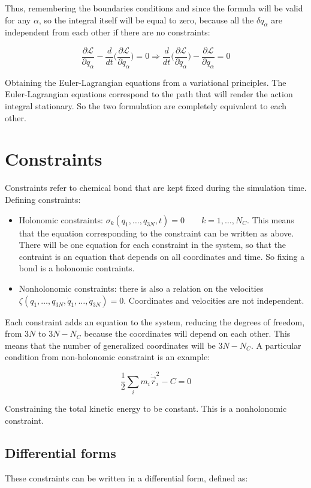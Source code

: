 	Thus, remembering the boundaries conditions and since the formula will be valid for any $\alpha$, so the integral itself will be equal to zero, because all the $\delta q_\alpha$ are independent from each other if there are no constraints:

	$$\frac{\partial\mathcal{L}}{\partial q_\alpha} - \frac{d}{dt}\biggl(\frac{\partial\mathcal{L}}{\partial\dot{q}_\alpha}\biggr) = 0\Rightarrow \frac{d}{dt}\biggl(\frac{\partial\mathcal{L}}{\partial\dot{q}_\alpha}\biggr)-\frac{\partial\mathcal{L}}{\partial q_\alpha} = 0$$

	Obtaining the Euler-Lagrangian equations from a variational principles.
	The Euler-Lagrangian equations correspond to the path that will render the action integral stationary.
	So the two formulation are completely equivalent to each other.

\section{Constraints}
Constraints refer to chemical bond that are kept fixed during the simulation time.
Defining constraints:

\begin{itemize}
	\item Holonomic constraints: $\sigma_k(q_1, \dots, q_{3N}, t) = 0\qquad k = 1, \dots, N_C$.
		This means that the equation corresponding to the constraint can be written as above.
		There will be one equation for each constraint in the system, so that the contraint is an equation that depends on all coordinates and time.
		So fixing a bond is a holonomic contraints.
	\item Nonholonomic constraints: there is also a relation on the velocities $\zeta(q_1, \dots, q_{3N}, \dot{q}_1, \dots, \dot{q}_{3N}) = 0$.
		Coordinates and velocities are not independent.
\end{itemize}

Each constraint adds an equation to the system, reducing the degrees of freedom, from $3N$ to $3N-N_C$ because the coordinates will depend on each other.
This means that the number of generalized coordinates will be $3N-N_C$.
A particular condition from non-holonomic constraint is an example:

$$\frac{1}{2}\sum\limits_{i}m_i\dot{\vec{r}}_i^2-C = 0$$

Constraining the total kinetic energy to be constant.
This is a nonholonomic constraint.

	\subsection{Differential forms}
	These constraints can be written in a differential form, defined as:

